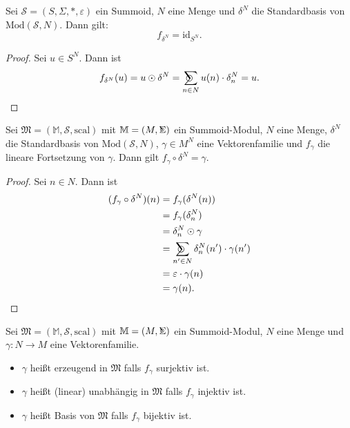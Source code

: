\documentclass{article}
\DeclareMathOperator*{\Sigmacirc}{%
  \ThisStyle{\mathop{\ensurestackMath{\stackinset{c}{-0.75\LMpt}{c}{}{%
  \rotatebox[origin=lb]{-90}{$\circ$}}{\SavedStyle\Sigma}}}}}
\DeclareMathOperator*{\sumcirc}{%
  \ThisStyle{\mathop{\ensurestackMath{\stackinset{c}{-1.5\LMpt}{c}{}{%
  \rotatebox[origin=lb]{-90}{$\SavedStyle\scalerel*{\bm\Circle}{%
  i}$}}{\SavedStyle\sum}}}}}
\begin{document}
\begin{theorem}\label{Theorem_DeltaNIdSN}
  Sei $\mathcal{S} = (S, \Sigma, \ast, \varepsilon)$ ein Summoid, $N$ eine Menge und $\delta^N$
  die Standardbasis von $\text{Mod}(\mathcal{S}, N)$.
  Dann gilt:
  \begin{equation*}
    f_{\delta^N} = \text{id}_{S^N}.
  \end{equation*}
\end{theorem}
\begin{proof}
  Sei $u \in S^N$. Dann ist
  \begin{align*}
    f_{\delta^N}(u)
    = u \odot \delta^N
    = \sumcirc_{n \in N} u(n) \cdot \delta^N_n
    = u.
  \end{align*}
\end{proof}

\begin{theorem}
  Sei $\mathfrak{M} = (\mathbb{M}, \mathcal{S}, \text{scal})$ mit $\mathbb{M} = (M, \Sigmacirc)$ ein Summoid-Modul, $N$ eine Menge,
  $\delta^N$ die Standardbasis von $\text{Mod}(\mathcal{S}, N)$,
  $\gamma \in M^N$ eine Vektorenfamilie und
  $f_\gamma$ die lineare Fortsetzung von $\gamma$.
  Dann gilt $f_\gamma \circ \delta^N = \gamma$.
\end{theorem}
\begin{proof}
  Sei $n \in N$.
  Dann ist
  \begin{align*}
    (f_\gamma \circ \delta^N)(n) 
    &= f_\gamma(\delta^N(n)) \\
    &= f_\gamma(\delta^N_n) \\
    &= \delta^N_n \odot \gamma \\
    &= \sumcirc_{n' \in N}\delta^N_n(n') \cdot \gamma(n') \\
    &= \varepsilon \cdot \gamma(n) \\
    &= \gamma(n).
  \end{align*}
\end{proof}

\begin{definition}
  Sei $\mathfrak{M} = (\mathbb{M}, \mathcal{S}, \text{scal})$ mit $\mathbb{M} = (M, \Sigmacirc)$ ein Summoid-Modul, $N$ eine Menge
  und $\gamma \colon N \to M$ eine Vektorenfamilie.
  \begin{itemize}
    \item $\gamma$ heißt erzeugend in $\mathfrak{M}$ falls $f_\gamma$ surjektiv ist.
    \item $\gamma$ heißt (linear) unabhängig in $\mathfrak{M}$ falls $f_\gamma$ injektiv ist.
    \item $\gamma$ heißt Basis von $\mathfrak{M}$ falls $f_\gamma$ bijektiv ist.
  \end{itemize}
\end{definition}
\end{document}
